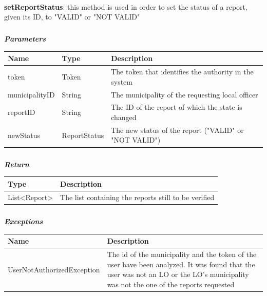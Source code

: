 					\paragraph{}
							\textbf{setReportStatus}: this method is used in order to set the status of a report, given its ID, to "VALID" or "NOT VALID"
							\subparagraph{}
							\vspace{-3mm}
							\textcolor{myBlue}{\textit{\textbf{Parameters}}}
							\vspace{-2mm}
								\begin{table}[!h]
									\begin{tabular}{L{0.2\textwidth}L{0.2\textwidth}L{0.48\textwidth}}
										\toprule
										\textbf{Name} & \textbf{Type} & \textbf{Description} \\
										\midrule
								  		token & Token & The token that identifies the authority in the system \\
								  		municipalityID & String & The municipality of the requesting local officer \\
								  		reportID & String & The ID of the report of which the state is changed \\
								  		newStatus & ReportStatus & The new status of the report ("VALID" or "NOT VALID") \\
								 		\bottomrule
									\end{tabular}
								\end{table}
							\subparagraph{}
							\vspace{-6mm}
								\textcolor{myGreen}{\textit{\textbf{Return}}}
								\vspace{-2mm}
									\begin{table}[!h]
									\begin{tabular}{L{0.2\textwidth}L{0.72\textwidth}}
										\toprule
										\textbf{Type} & \textbf{Description} \\
										\midrule
								  		List<Report> & The list containing the reports still to be verified \\
								 		\bottomrule
									\end{tabular}
								\end{table}
							\clearpage
							\subparagraph{}
								\textcolor{myRed}{\textit{\textbf{Exceptions}}}
								\vspace{-2mm}
									\begin{table}[!h]
									\begin{tabular}{L{0.4\textwidth}L{0.52\textwidth}}
										\toprule
										\textbf{Name} & \textbf{Description} \\
										\midrule
								  	UserNotAuthorizedException & The id of the municipality and the token of the user have been analyzed. It was found that the user was not an LO or the LO's municipality was not the one of the reports requested \\
								 		\bottomrule
									\end{tabular}
								\end{table}

